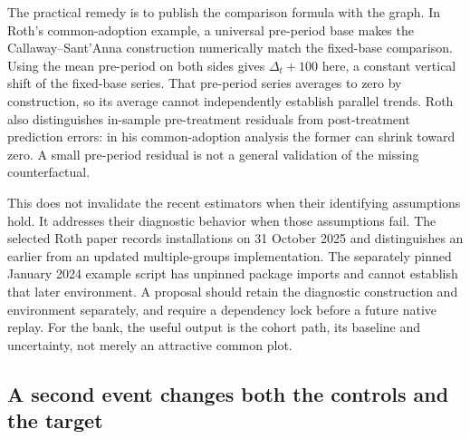 The practical remedy is to publish the comparison formula with the graph. In Roth's common-adoption example, a universal
pre-period base makes the Callaway--Sant'Anna construction numerically match the fixed-base comparison. Using the mean
pre-period on both sides gives $\Delta_t+100$ here, a constant vertical shift of the fixed-base series.
That pre-period series averages to zero by construction, so its average cannot independently establish parallel trends.
Roth also distinguishes in-sample pre-treatment residuals from post-treatment prediction errors: in his common-adoption
analysis the former can shrink toward zero. A small pre-period residual is not a general validation of the missing
counterfactual.~\citep{exec28_panel_roth}

This does not invalidate the recent estimators when their identifying assumptions hold. It addresses their diagnostic
behavior when those assumptions fail. The selected Roth paper records installations on 31 October 2025 and distinguishes
an earlier from an updated multiple-groups implementation. The separately pinned January 2024 example script has unpinned
package imports and cannot establish that later environment. A proposal should retain the diagnostic construction and
environment separately, and require a dependency lock before a future native replay. For the bank, the useful output is
the cohort path, its baseline and uncertainty, not merely an attractive common plot.~\citep{exec28_panel_roth,exec28_panel_software}

\subsection{A second event changes both the controls and the target}

